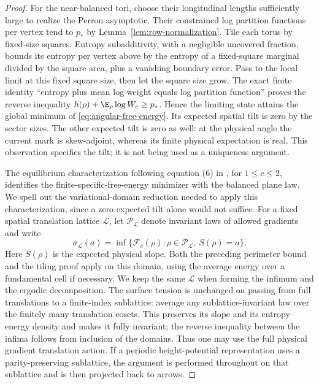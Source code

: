 \begin{proof}
For the near-balanced tori, choose their longitudinal lengths sufficiently
large to realize the Perron asymptotic.  Their constrained log partition
functions per vertex tend to $p_*$ by
Lemma~\ref{lem:row-normalization}.  Tile each torus by fixed-size squares.
Entropy subadditivity, with a negligible uncovered fraction, bounds its
entropy per vertex above by the entropy of a fixed-square marginal
divided by the square area, plus a vanishing boundary error.  Pass to the
local limit at this fixed square size, then let the square size grow.
The exact finite identity ``entropy plus mean log weight equals log
partition function'' proves the reverse inequality
$h(\rho)+\E_\rho\log W_c\ge p_*$.  Hence the limiting state attains
the global minimum of \eqref{eq:angular-free-energy}.  Its expected
spatial tilt is zero by the sector sizes.  The other expected tilt is
zero as well: at the physical angle the current mark is skew-adjoint,
whereas its finite physical expectation is real.  This observation
specifies the tilt; it is not being used as a uniqueness argument.

The equilibrium characterization following equation (6) in
\cite{DKLM2026}, for $1\le c\le2$, identifies the
finite-specific-free-energy minimizer with the balanced plane law.
We spell out the variational-domain reduction needed to apply this
characterization, since a zero expected tilt alone would not suffice.
For a fixed spatial translation lattice $\mathcal L$, let
$\mathcal P_{\mathcal L}$ denote invariant laws of allowed gradients and
write
\[
 \sigma_{\mathcal L}(a)
  =\inf\{\mathcal F_c(\rho):\rho\in\mathcal P_{\mathcal L},\ S(\rho)=a\}.
\]
Here $S(\rho)$ is the expected physical slope.  Both the preceding
perimeter bound and the tiling proof apply on this domain, using the
average energy over a fundamental cell if necessary.  We keep the same
$\mathcal L$ when forming the infimum and the ergodic decomposition.
The surface tension is unchanged on passing from full translations to
a finite-index sublattice: average any sublattice-invariant law over
the finitely many translation cosets.  This preserves its slope and
its entropy--energy density and makes it fully invariant; the reverse
inequality between the infima follows from inclusion of the domains.
Thus one may use the full physical gradient translation action.  If a
periodic height-potential representation uses a parity-preserving
sublattice, the argument is performed throughout on that sublattice
and is then projected back to arrows.


\end{proof}
